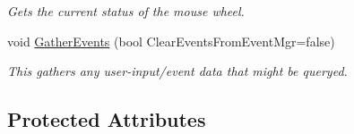 \begin{DoxyCompactItemize}
\begin{DoxyCompactList}\small\item\em Gets the current status of the mouse wheel. \item\end{DoxyCompactList}\item 
void \hyperlink{classphys_1_1InputQueryTool_a9779d812418f1fddb0880df0c607242b}{GatherEvents} (bool ClearEventsFromEventMgr=false)
\begin{DoxyCompactList}\small\item\em This gathers any user-\/input/event data that might be queryed. \item\end{DoxyCompactList}\end{DoxyCompactItemize}
\subsection*{Protected Attributes}
